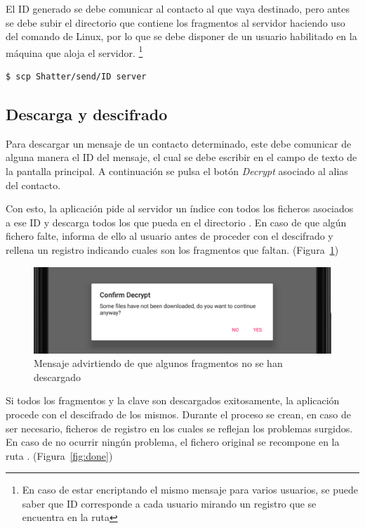 El ID generado se debe comunicar al contacto al que vaya destinado, pero antes se debe subir el directorio que contiene los fragmentos al servidor haciendo uso del comando  de Linux, por lo que se debe disponer de un usuario habilitado en la máquina que aloja el servidor. \footnote{En caso de estar encriptando el mismo mensaje para varios usuarios, se puede saber que ID corresponde a cada usuario mirando un registro que se encuentra en la ruta }

\lstset{basicstyle=\ttfamily}
\begin{lstlisting}[language=bash]
  $ scp Shatter/send/ID server
\end{lstlisting}

\subsection{Descarga y descifrado}

Para descargar un mensaje de un contacto determinado, este debe comunicar de alguna manera el ID del mensaje, el cual se debe escribir en el campo de texto de la pantalla principal. A continuación se pulsa el botón \emph{Decrypt} asociado al alias del contacto.

Con esto, la aplicación pide al servidor un índice con todos los ficheros asociados a ese ID y descarga todos los que pueda en el directorio . En caso de que algún fichero falte, informa de ello al usuario antes de proceder con el descifrado y rellena un registro indicando cuales son los fragmentos que faltan. (Figura~\ref{fig:miss})

\begin{figure}[!htb]
  \centering
  \includegraphics[scale=0.4]{Figures/miss}
  \decoRule
  \caption[Shatter (Faltan fragmentos)]{Mensaje advirtiendo de que algunos fragmentos no se han descargado}
  \label{fig:miss}
\end{figure}

Si todos los fragmentos y la clave son descargados exitosamente, la aplicación procede con el descifrado de los mismos. Durante el proceso se crean, en caso de ser necesario, ficheros de registro en los cuales se reflejan los problemas surgidos. En caso de no ocurrir ningún problema, el fichero original se recompone en la ruta . (Figura~\ref{fig:done})

